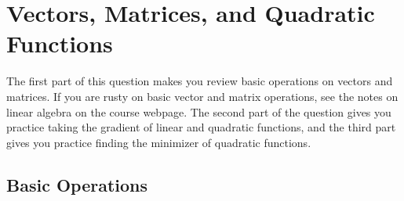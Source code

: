 \documentclass{article}
\begin{document}
\section{Vectors, Matrices, and Quadratic Functions}

The first part of this question makes you review basic operations on vectors and matrices. 
If you are rusty on basic vector and matrix operations, see the notes on linear algebra on the course webpage. 
The second part of the question gives you practice taking the gradient of linear and quadratic functions, 
and the third part gives you practice finding the minimizer of quadratic functions.

\subsection{Basic Operations}
\end{document}
